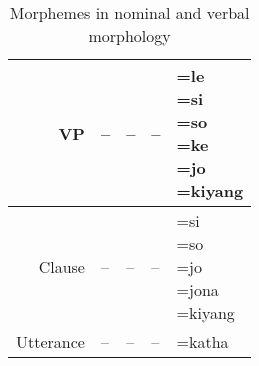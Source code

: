 \begin{table}
\begin{tabular}{r|llll}
						\hline
VP & -- & -- & -- & \parbox{2cm}{\vspace{.2cm}=le\\=si\\=so\\=ke\\=jo\\=kiyang\vspace{.2cm}}\\
						\hline
Clause & --  & --  & --  &  \parbox{2cm}{\vspace{.2cm}=si\\=so\\=jo\\=jona\\=kiyang\vspace{.2cm}}\\
						\hline
Utterance & --  & --  &  -- & =katha \vspace{.2cm}\\
						\hline
						\hline
		\end{tabular}
	\caption{Morphemes in nominal and verbal morphology}
	\label{tab:MorphemesInNominalAndVerbalMorphology}
\end{table}

 
